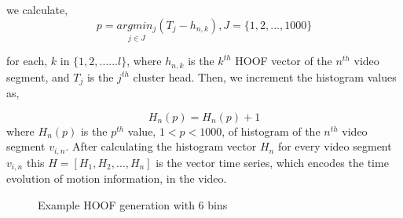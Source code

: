 we calculate,
\begin{equation}
p = \underset{j\in J}{argmin_{j}}(T_{j}-h_{n,k}), J=\{1,2,...,1000\}
\end{equation}

for each, $k$ in $\big\{1,2,......l\big\}$, where $h_{n,k}$ is the $k^{th}$ HOOF vector of the $n^{th}$ video segment, and $T_{j}$ is the $j^{th}$ cluster head. Then,
we increment the histogram values as,

\begin{equation}
H_{n}(p) = H_{n}(p)+1
\end{equation}
where $H_{n}(p)$ is the $p^{th}$ value, $1<p<1000$, of histogram of the $n^{th}$ video segment $v_{i,n}$. After calculating the histogram vector $H_{n}$ for every video segment $v_{i,n}$
this $H = [H_{1},H_{2}, \dots, H_{n}]$ is the vector time series, which encodes the time evolution of motion information, in the video.

\begin{figure}
  \centering
  
  \caption{Example HOOF generation with 6 bins}\label{fi:hoof}
\end{figure}
